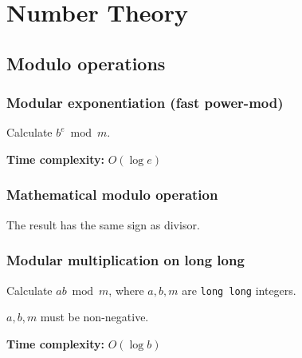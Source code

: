 
\newcommand{\BookNo}{2}
\newcommand{\BookTitle}{Number Theory \\[0.2cm] Linear Algebra \\[0.4cm] Combinatorics}


\setmainfont{Times New Roman}
\setlength{\parskip}{0.0in}
\tableofcontents
\setlength{\parskip}{0.1in}
\newevenpage
\section{Number Theory}
\subsection{Modulo operations}
\subsubsection{Modular exponentiation (fast power-mod)} \label{powmod}
Calculate $b^e \bmod m$. \par
\textbf{Time complexity:} $O(\log e)$ \par


\subsubsection{Mathematical modulo operation}
The result has the same sign as divisor. \par


\subsubsection{Modular multiplication on long long} \label{mulmod}
Calculate $ab \bmod m$, where $a, b, m$ are \lstinline|long long| integers. \par
\Warning $a, b, m$ must be non-negative. \par
\textbf{Time complexity:} $O(\log b)$ \par



